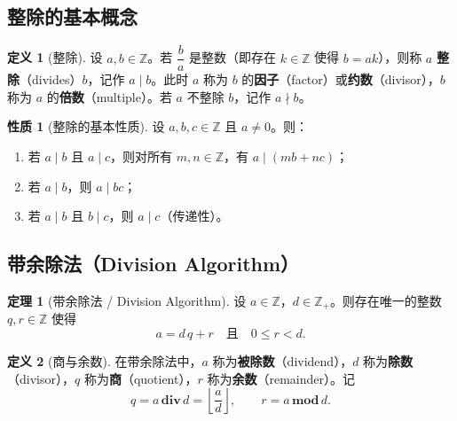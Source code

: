 \documentclass[UTF8,11pt,a4paper]{ctexbook}   %
\theoremstyle{definition}
\newtheorem{definition}{定义}[section]
\newtheorem{theorem}{定理}[section]
\newtheorem{property}{性质}[section]
\begin{document}
\subsection{整除的基本概念}

\begin{definition}[整除]
设 $a,b\in\mathbb{Z}$。若 $\dfrac{b}{a}$ 是整数（即存在 $k\in\mathbb{Z}$ 使得 $b=ak$），则称 $a$ \textbf{整除}（divides）$b$，记作 $a\mid b$。此时 $a$ 称为 $b$ 的\textbf{因子}（factor）或\textbf{约数}（divisor），$b$ 称为 $a$ 的\textbf{倍数}（multiple）。若 $a$ 不整除 $b$，记作 $a\nmid b$。
\end{definition}

\begin{property}[整除的基本性质]
设 $a,b,c\in\mathbb{Z}$ 且 $a\neq 0$。则：
\begin{enumerate}
    \item 若 $a\mid b$ 且 $a\mid c$，则对所有 $m,n\in\mathbb{Z}$，有 $a\mid(mb+nc)$；
    \item 若 $a\mid b$，则 $a\mid bc$；
    \item 若 $a\mid b$ 且 $b\mid c$，则 $a\mid c$（传递性）。
\end{enumerate}
\end{property}

\subsection{带余除法（Division Algorithm）}

\begin{theorem}[带余除法 / Division Algorithm]
设 $a\in\mathbb{Z}$，$d\in\mathbb{Z}_+$。则存在唯一的整数 $q,r\in\mathbb{Z}$ 使得
\[ a = d\,q + r \quad\text{且}\quad 0\le r < d. \]
\end{theorem}

\begin{definition}[商与余数]
在带余除法中，$a$ 称为\textbf{被除数}（dividend），$d$ 称为\textbf{除数}（divisor），$q$ 称为\textbf{商}（quotient），$r$ 称为\textbf{余数}（remainder）。记
\[ q = a\,\mathbf{div}\,d = \left\lfloor\frac{a}{d}\right\rfloor,\qquad r = a\,\mathbf{mod}\,d. \]
\end{definition}
\end{document}

